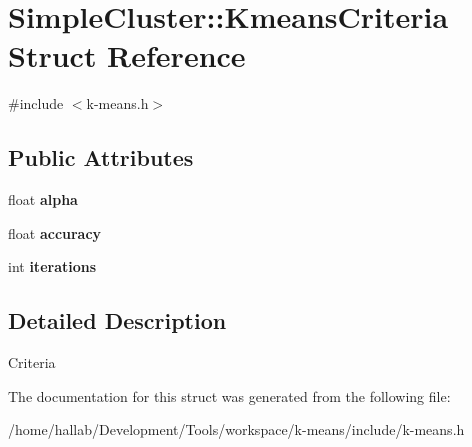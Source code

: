 \hypertarget{structSimpleCluster_1_1KmeansCriteria}{\section{Simple\-Cluster\-:\-:Kmeans\-Criteria Struct Reference}
\label{structSimpleCluster_1_1KmeansCriteria}
}


{\ttfamily \#include $<$k-\/means.\-h$>$}

\subsection*{Public Attributes}
\begin{DoxyCompactItemize}
\item 
\hypertarget{structSimpleCluster_1_1KmeansCriteria_a9426913686aebbc58eb187fb8db53e0c}{float {\bfseries alpha}}\label{structSimpleCluster_1_1KmeansCriteria_a9426913686aebbc58eb187fb8db53e0c}

\item 
\hypertarget{structSimpleCluster_1_1KmeansCriteria_a9bbd1978f0675aee35966dc008e5c61b}{float {\bfseries accuracy}}\label{structSimpleCluster_1_1KmeansCriteria_a9bbd1978f0675aee35966dc008e5c61b}

\item 
\hypertarget{structSimpleCluster_1_1KmeansCriteria_a315f994501adf69d674ff6ab57291f91}{int {\bfseries iterations}}\label{structSimpleCluster_1_1KmeansCriteria_a315f994501adf69d674ff6ab57291f91}

\end{DoxyCompactItemize}


\subsection{Detailed Description}
Criteria 

The documentation for this struct was generated from the following file\-:\begin{DoxyCompactItemize}
\item 
/home/hallab/\-Development/\-Tools/workspace/k-\/means/include/k-\/means.\-h\end{DoxyCompactItemize}
